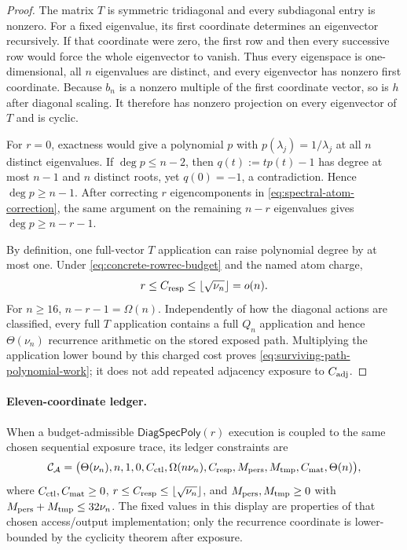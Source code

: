 \begin{proof}
The matrix $T$ is symmetric tridiagonal and every subdiagonal entry is
nonzero.  For a fixed eigenvalue, its first coordinate determines an
eigenvector recursively.  If that coordinate were zero, the first row and
then every successive row would force the whole eigenvector to vanish.
Thus every eigenspace is one-dimensional, all $n$ eigenvalues are distinct,
and every eigenvector has nonzero first coordinate.  Because
$b_n$ is a nonzero multiple of the first coordinate vector, so is $h$ after
diagonal scaling.  It therefore has nonzero projection on every eigenvector
of $T$ and is cyclic.

For $r=0$, exactness would give a polynomial $p$ with
$p(\lambda_j)=1/\lambda_j$ at all $n$ distinct eigenvalues.  If
$\deg p\leq n-2$, then $q(t):=tp(t)-1$ has degree at most $n-1$ and $n$
distinct roots, yet $q(0)=-1$, a contradiction.  Hence
$\deg p\geq n-1$.  After correcting $r$ eigencomponents in
\cref{eq:spectral-atom-correction}, the same argument on the remaining
$n-r$ eigenvalues gives $\deg p\geq n-r-1$.

By definition, one full-vector $T$ application can raise polynomial degree by
at most one.  Under \cref{eq:concrete-rowrec-budget} and the named atom charge,
\[
 r\leq C_{\rm resp}\leq\lfloor\sqrt{\nu_n}\rfloor=o(n).
\]
For $n\geq16$, $n-r-1=\Omega(n)$.  Independently of how the diagonal actions
are classified, every full $T$ application contains a full $Q_n$ application
and hence $\Theta(\nu_n)$ recurrence arithmetic on the stored exposed path.
Multiplying the application lower bound by this charged cost proves
\cref{eq:surviving-path-polynomial-work}; it does not add repeated adjacency
exposure to $C_{\rm adj}$.
\end{proof}

\paragraph{Eleven-coordinate ledger.}
When a budget-admissible $\mathsf{DiagSpecPoly}(r)$ execution is coupled to
the same chosen sequential exposure trace, its ledger constraints are
\begin{equation}
 \mathcal C_{\mathcal A}=\bigl(
 \Theta(\nu_n),n,1,0,C_{\rm ctl},\Omega(n\nu_n),C_{\rm resp},
 M_{\rm pers},M_{\rm tmp},C_{\rm mat},\Theta(n)\bigr),
 \label{eq:surviving-named-subclass-resource-constraints}
\end{equation}
where $C_{\rm ctl},C_{\rm mat}\geq0$,
$r\leq C_{\rm resp}\leq\lfloor\sqrt{\nu_n}\rfloor$, and
$M_{\rm pers},M_{\rm tmp}\geq0$ with
$M_{\rm pers}+M_{\rm tmp}\leq32\nu_n$.  The fixed values in this display are
properties of that chosen access/output implementation; only the recurrence
coordinate is lower-bounded by the cyclicity theorem after exposure.

